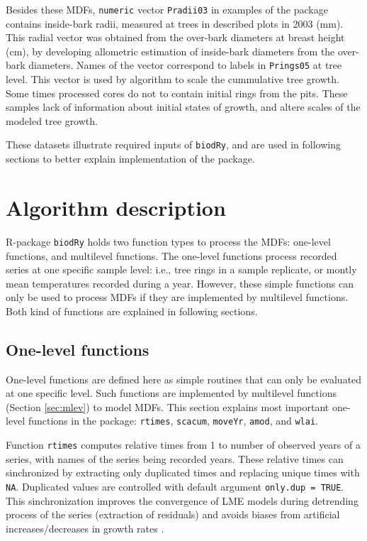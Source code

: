 \documentclass[review,authoryear]{elsarticle}
\begin{document}
Besides these MDFs, {\tt numeric} vector {\tt Pradii03} in examples of
the package contains inside-bark radii, measured at trees in described
plots in 2003 (mm). This radial vector was obtained from the over-bark
diameters at breast height (cm), by developing allometric estimation
of inside-bark diameters from the over-bark diameters. Names of the
vector correspond to labels in {\tt Prings05} at tree level. This
vector is used by algorithm to scale the cummulative tree growth. Some
times processed cores do not to contain initial rings from the
pits. These samples lack of information about initial states of
growth, and altere scales of the modeled tree growth.

These datasets illustrate required inputs of {\tt biodRy}, and
are used in following sections to better explain implementation of
the package.

\section{Algorithm description}
R-package {\tt biodRy} holds two function types to process the MDFs:
one-level functions, and multilevel functions. The one-level functions
process recorded series at one specific sample level: i.e., tree rings
in a sample replicate, or montly mean temperatures recorded during a
year.  However, these simple functions can only be used to process
MDFs if they are implemented by multilevel functions. Both kind of
functions are explained in following sections.

\subsection{One-level functions}\label{sec:onelev}

One-level functions are defined here as simple routines that can only
be evaluated at one specific level. Such functions are implemented by
multilevel functions (Section \ref{sec:mlev}) to model MDFs. This
section explains most important one-level functions in the package:
{\tt rtimes}, {\tt scacum}, {\tt moveYr}, {\tt amod}, and {\tt wlai}.

Function {\tt rtimes} computes relative times from 1 to number of
observed years of a series, with names of the series being recorded
years.  These relative times can sinchronized by extracting only
duplicated times and replacing unique times with {\tt NA}. Duplicated
values are controlled with default argument {\tt only.dup =
  TRUE}. This sinchronization improves the convergence of LME models
during detrending process of the series (extraction of residuals) and
avoids biases from artificial increases/decreases in growth rates
\citep{Bowman2013}.
\end{document}
